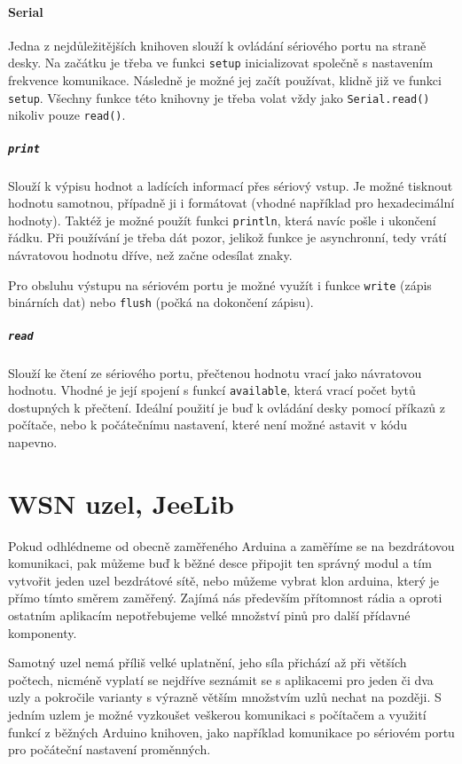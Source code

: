 \documentclass[12pt,titlepage]{article}
\begin{document}
		\paragraph{Serial}
			Jedna z nejdůležitějších knihoven slouží k ovládání sériového portu na straně desky. Na začátku je třeba ve funkci \texttt{setup} inicializovat společně s nastavením frekvence komunikace. Následně je možné jej začít používat, klidně již ve funkci \texttt{setup}. Všechny funkce této knihovny je třeba volat vždy jako \texttt{Serial.read()} nikoliv pouze \texttt{read()}.

			\subparagraph{\texttt{print}}
				Slouží k výpisu hodnot a ladících informací přes sériový vstup. Je možné tisknout hodnotu samotnou, případně ji i formátovat (vhodné například pro hexadecimální hodnoty). Taktéž je možné použít funkci \texttt{println}, která navíc pošle i ukončení řádku. Při používání je třeba dát pozor, jelikož funkce je
				asynchronní, tedy vrátí návratovou hodnotu dříve, než začne odesílat znaky.

				Pro obsluhu výstupu na sériovém portu je možné využít i funkce \texttt{write} (zápis binárních dat) nebo \texttt{flush} (počká na dokončení zápisu).

			\subparagraph{\texttt{read}}
				Slouží ke čtení ze sériového portu, přečtenou hodnotu vrací jako návratovou hodnotu. Vhodné je její spojení s funkcí \texttt{available}, která vrací počet bytů dostupných k přečtení. Ideální použití je buď k ovládání desky pomocí příkazů z počítače, nebo k počátečnímu nastavení, které není možné astavit v kódu napevno.

\section{WSN uzel, JeeLib}

	Pokud odhlédneme od obecně zaměřeného Arduina a zaměříme se na bezdrátovou komunikaci, pak můžeme buď k běžné desce připojit ten správný modul a tím vytvořit jeden uzel bezdrátové sítě, nebo můžeme vybrat klon arduina, který je přímo tímto směrem zaměřený. Zajímá nás především přítomnost rádia a oproti ostatním aplikacím nepotřebujeme velké množství pinů pro další přídavné komponenty.

	Samotný uzel nemá příliš velké uplatnění, jeho síla přichází až při větších počtech, nicméně vyplatí se nejdříve seznámit se s aplikacemi pro jeden či dva uzly a pokročile varianty s výrazně větším množstvím uzlů nechat na později. S jedním uzlem je možné vyzkoušet veškerou komunikaci s počítačem a využití funkcí z běžných Arduino knihoven, jako například komunikace po sériovém portu pro počáteční nastavení proměnných.
\end{document}
